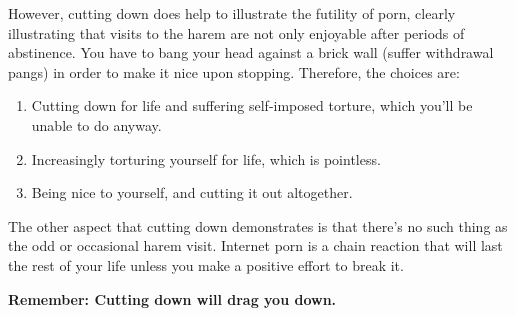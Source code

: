 \documentclass[easypeasy.tex]{subfiles}
\begin{document}
However, cutting down does help to illustrate the futility of porn, clearly illustrating that visits to the harem are not only enjoyable after periods of abstinence. You have to bang your head against a brick wall (suffer withdrawal pangs) in order to make it nice upon stopping. Therefore, the choices are:
\begin{enumerate}
  \item Cutting down for life and suffering self-imposed torture, which you'll be unable to do anyway.
  \item Increasingly torturing yourself for life, which is pointless.
  \item Being nice to yourself, and cutting it out altogether.
\end{enumerate}
The other aspect that cutting down demonstrates is that there's no such thing as the odd or occasional harem visit. Internet porn is a chain reaction that will last the rest of your life unless you make a positive effort to break it.

\textbf{Remember: Cutting down will drag you down.}
\end{document}
